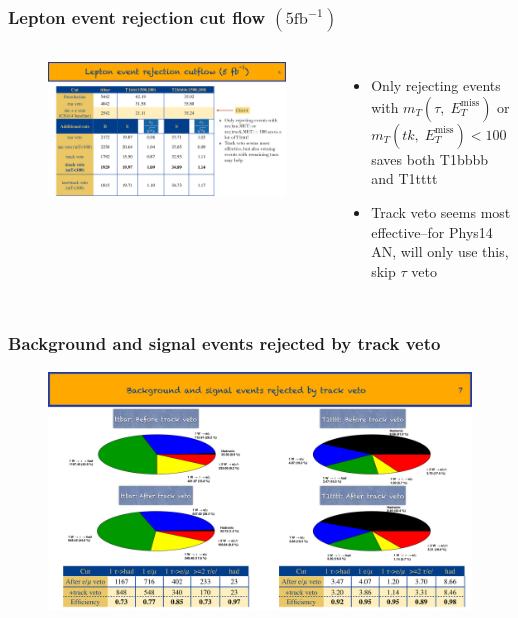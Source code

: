 \documentclass{beamer}
\begin{document}
\begin{frame}
  \frametitle{Lepton event rejection cut flow $(5\mathrm{fb}^{-1})$}
  \begin{columns}[c] %
    \begin{figure}[h]
      \centering
      \includegraphics[width=\textwidth]{figures/jacks_Studies/cutflow_baseline}
    \end{figure}
    \begin{itemize}
    \item Only rejecting events with $m_T(\tau,\;
      E_{T}^{\mathrm{miss}})$ or $m_T(tk,\; E_{T}^{\mathrm{miss}}) <
      100$ saves both T1bbbb and T1tttt
    \item Track veto seems most effective--for Phys14 AN, will only use
      this, skip $\tau$ veto
    \end{itemize}
  \end{columns}
\end{frame}

\begin{frame}
  \frametitle{Background and signal events rejected by track veto}
  \begin{figure}
    \includegraphics[width=\textwidth]{figures/jacks_Studies/rejection_slide}
  \end{figure}
\end{frame}
\end{document}
